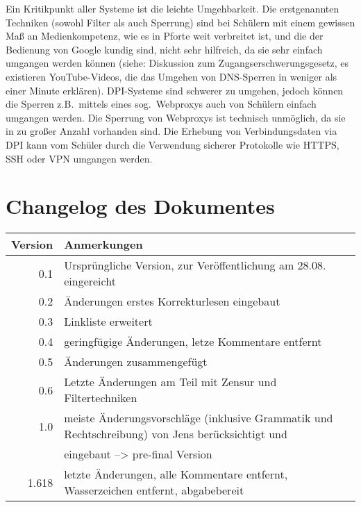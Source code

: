\documentclass[10pt,a4paper,notitlepage]{scrartcl}
\begin{document}
\begin{multicols}{2}
Ein Kritikpunkt aller Systeme ist die leichte Umgehbarkeit. Die erstgenannten Techniken (sowohl Filter als auch Sperrung) sind bei Schülern mit einem gewissen Maß an Medienkompetenz, wie es in Pforte weit verbreitet ist, und die der Bedienung von Google kundig sind, nicht sehr hilfreich, da sie sehr einfach umgangen werden können (siehe: Diskussion zum \glqq Zugangserschwerungsgesetz\grqq, es existieren YouTube-Videos, die das Umgehen von DNS-Sperren in weniger als einer Minute erklären).
DPI-Systeme sind schwerer zu umgehen, jedoch können die Sperren z.B.\ mittels eines sog.\ Webproxys auch von Schülern einfach umgangen werden. Die Sperrung von Webproxys ist technisch unmöglich, da sie in zu großer Anzahl vorhanden sind. Die Erhebung von Verbindungsdaten via DPI kann vom Schüler durch die Verwendung sicherer Protokolle wie HTTPS, SSH oder VPN umgangen werden.
\end{multicols}
\newpage
\section*{Changelog des Dokumentes}
\begin{tabularx}{\textwidth}{r|l}
\textbf{Version}&\textbf{Anmerkungen}\\\hline
0.1&Ursprüngliche Version, zur Veröffentlichung am 28.08. eingereicht 
\\\hline
0.2&Änderungen erstes Korrekturlesen eingebaut\\\hline
0.3&Linkliste erweitert\\\hline
0.4&geringfügige Änderungen, letze Kommentare entfernt\\\hline
0.5&Änderungen zusammengefügt\\\hline
0.6&Letzte Änderungen am Teil mit Zensur und Filtertechniken\\\hline
1.0&meiste Änderungsvorschläge (inklusive Grammatik und Rechtschreibung) von Jens berücksichtigt und \\ &eingebaut --> pre-final Version \\\hline
1.618&letzte Änderungen, alle Kommentare entfernt, Wasserzeichen entfernt, abgabebereit 
\end{tabularx}
\end{document}
